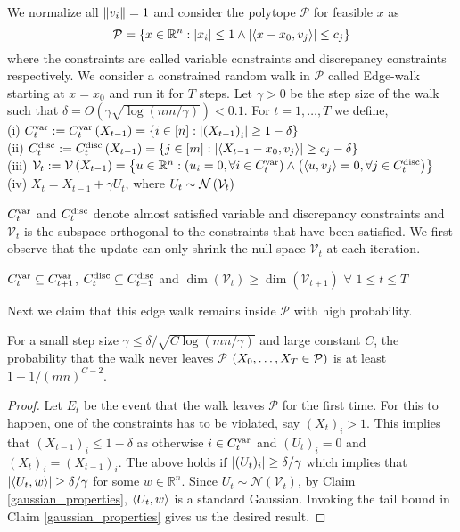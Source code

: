 We normalize all $\left\lVert v_i \right\rVert=1$ and consider the polytope $\mathcal{P}$ for feasible $x$ as
\[ \mathcal{P} = \left\{x\in \mathbb{R}^n : \left\lvert x_i \right\rvert \leq 1 \wedge \left\lvert \left\langle x-x_0,v_j\right\rangle \right\rvert \leq c_j \right\}\]
where the constraints are called variable constraints and discrepancy constraints respectively.
We consider a constrained random walk in $\mathcal{P}$ called Edge-walk starting at $x=x_0$ and run it for $T$ steps. Let $\gamma >0$ be the step size of the walk such that $\delta = O(\gamma \sqrt{\log(nm/\gamma)}) < 0.1$. For $t= 1,\hdots,T$ we define,\\
(i) $C^{\mathrm{var}}_t := C^{\mathrm{var}}_t\left(X_{t-1} \right ) = \left\{ i \in [n] : \left\lvert \left(X_{t-1} \right )_i \right\rvert \geq 1- \delta\right\}$ \\
(ii) $C^{\mathrm{disc}}_t := C^{\mathrm{disc}}_t\left(X_{t-1} \right ) = \left\{j \in [m] : \left\lvert \left\langle X_{t-1}-x_0,v_j\right\rangle \right\rvert \geq c_j - \delta\right\}$ \\
(iii) $\mathcal{V}_t := \mathcal{V}\left(X_{t-1} \right ) = \left\{u \in \mathbb{R}^n : \left(u_i = 0, \forall i \in C^{\mathrm{var}}_t \right ) \wedge \left(\left\langle u,v_j\right\rangle=0, \forall j \in C^{\mathrm{disc}}_t \right ) \right\}$  \\
(iv) $X_t = X_{t-1} + \gamma U_t$, where $U_t \sim \mathcal{N}\left(\mathcal{V}_t \right )$

$C^{\mathrm{var}}_t$ and $C^{\mathrm{disc}}_t$ denote almost satisfied variable and discrepancy constraints and $\mathcal{V}_t$ is the subspace orthogonal to the constraints that have been satisfied.
We first observe that the update can only shrink the null space $\mathcal{V}_t$ at each iteration.
\begin{Claim}
$C^{\mathrm{var}}_t \subseteq C^{\mathrm{var}}_{t+1}$, $C^{\mathrm{disc}}_t \subseteq C^{\mathrm{disc}}_{t+1}$ and $\dim(\mathcal{V}_t) \geq \dim(\mathcal{V}_{t+1})$ $\forall$ $1 \leq t \leq T$
\end{Claim}

Next we claim that this edge walk remains inside $\mathcal{P}$ with high probability.
\begin{Claim}
For a small step size $\gamma \leq \delta/\sqrt{C\log(mn/\gamma)}$ and large constant $C$, the probability that the walk never leaves $\mathcal{P}$ $\left(X_0,\hdots,X_T \in \mathcal{P} \right )$ is at least $1 - 1/(mn)^{C-2}$.
\end{Claim}
\begin{proof}
Let $E_t$ be the event that the walk leaves $\mathcal{P}$ for the first time.
For this to happen, one of the constraints has to be violated, say $(X_t)_i>1$.
This implies that $(X_{t-1})_i \leq 1 - \delta$ as otherwise $i \in C^{\mathrm{var}}_t$ and $(U_t)_i=0$ and $(X_{t})_i=(X_{t-1})_i$.
The above holds if $\left\lvert (U_t)_i \right\rvert \geq \delta/\gamma$ which implies that $\left\lvert \left\langle U_t,w\right\rangle \right\rvert \geq \delta/\gamma$ for some $w \in \mathbb{R}^n$.
Since $U_t \sim \mathcal{N}(\mathcal{V}_t)$, by Claim \ref{gaussian_properties}, $\left\langle U_t,w\right\rangle$ is a standard Gaussian. Invoking the tail bound in Claim \ref{gaussian_properties} gives us the desired result.
\end{proof}

